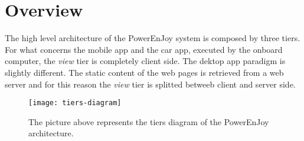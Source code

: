 \section{Overview}
The high level architecture of the PowerEnJoy system is composed by three tiers. For what concerns the mobile app and the car app, executed by the onboard computer, the \textit{view} tier is completely client side. The dektop app paradigm is slightly different. The static content of the web pages is retrieved from a web server and for this reason the \textit{view} tier is splitted betweeb client and server side.

\begin{figure}[H]
	\centering
	\texttt{[image: tiers-diagram]}
	\caption[Tiers Diagram]{The picture above represents the tiers diagram of the PowerEnJoy architecture.}
	\label{fig:tiers-diagram}
\end{figure}
